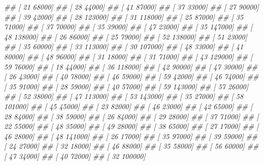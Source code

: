 \documentclass[
]{book}
\newenvironment{Shaded}{\begin{snugshade}}{\end{snugshade}}
\newcommand{\CommentTok}[1]{\textcolor[rgb]{0.56,0.35,0.01}{\textit{#1}}}
\theoremstyle{definition}
\theoremstyle{definition}
\theoremstyle{definition}
\theoremstyle{definition}
\theoremstyle{remark}
\begin{document}
\begin{Shaded}
\begin{Highlighting}[]
\CommentTok{\#\#  [    21  68000]}
\CommentTok{\#\#  [    28  44000]}
\CommentTok{\#\#  [    41  87000]}
\CommentTok{\#\#  [    37  33000]}
\CommentTok{\#\#  [    27  90000]}
\CommentTok{\#\#  [    39  42000]}
\CommentTok{\#\#  [    28 123000]}
\CommentTok{\#\#  [    31 118000]}
\CommentTok{\#\#  [    25  87000]}
\CommentTok{\#\#  [    35  71000]}
\CommentTok{\#\#  [    37  70000]}
\CommentTok{\#\#  [    35  39000]}
\CommentTok{\#\#  [    47  23000]}
\CommentTok{\#\#  [    35 147000]}
\CommentTok{\#\#  [    48 138000]}
\CommentTok{\#\#  [    26  86000]}
\CommentTok{\#\#  [    25  79000]}
\CommentTok{\#\#  [    52 138000]}
\CommentTok{\#\#  [    51  23000]}
\CommentTok{\#\#  [    35  60000]}
\CommentTok{\#\#  [    33 113000]}
\CommentTok{\#\#  [    30 107000]}
\CommentTok{\#\#  [    48  33000]}
\CommentTok{\#\#  [    41  80000]}
\CommentTok{\#\#  [    48  96000]}
\CommentTok{\#\#  [    31  18000]}
\CommentTok{\#\#  [    31  71000]}
\CommentTok{\#\#  [    43 129000]}
\CommentTok{\#\#  [    59  76000]}
\CommentTok{\#\#  [    18  44000]}
\CommentTok{\#\#  [    36 118000]}
\CommentTok{\#\#  [    42  90000]}
\CommentTok{\#\#  [    47  30000]}
\CommentTok{\#\#  [    26  43000]}
\CommentTok{\#\#  [    40  78000]}
\CommentTok{\#\#  [    46  59000]}
\CommentTok{\#\#  [    59  42000]}
\CommentTok{\#\#  [    46  74000]}
\CommentTok{\#\#  [    35  91000]}
\CommentTok{\#\#  [    28  59000]}
\CommentTok{\#\#  [    40  57000]}
\CommentTok{\#\#  [    59 143000]}
\CommentTok{\#\#  [    57  26000]}
\CommentTok{\#\#  [    52  38000]}
\CommentTok{\#\#  [    47 113000]}
\CommentTok{\#\#  [    53 143000]}
\CommentTok{\#\#  [    35  27000]}
\CommentTok{\#\#  [    58 101000]}
\CommentTok{\#\#  [    45  45000]}
\CommentTok{\#\#  [    23  82000]}
\CommentTok{\#\#  [    46  23000]}
\CommentTok{\#\#  [    42  65000]}
\CommentTok{\#\#  [    28  84000]}
\CommentTok{\#\#  [    38  59000]}
\CommentTok{\#\#  [    26  84000]}
\CommentTok{\#\#  [    29  28000]}
\CommentTok{\#\#  [    37  71000]}
\CommentTok{\#\#  [    22  55000]}
\CommentTok{\#\#  [    48  35000]}
\CommentTok{\#\#  [    49  28000]}
\CommentTok{\#\#  [    38  65000]}
\CommentTok{\#\#  [    27  17000]}
\CommentTok{\#\#  [    46  28000]}
\CommentTok{\#\#  [    48 141000]}
\CommentTok{\#\#  [    26  17000]}
\CommentTok{\#\#  [    35  97000]}
\CommentTok{\#\#  [    39  59000]}
\CommentTok{\#\#  [    24  27000]}
\CommentTok{\#\#  [    32  18000]}
\CommentTok{\#\#  [    46  88000]}
\CommentTok{\#\#  [    35  58000]}
\CommentTok{\#\#  [    56  60000]}
\CommentTok{\#\#  [    47  34000]}
\CommentTok{\#\#  [    40  72000]}
\CommentTok{\#\#  [    32 100000]}

\end{Highlighting}
\end{Shaded}
\end{document}
